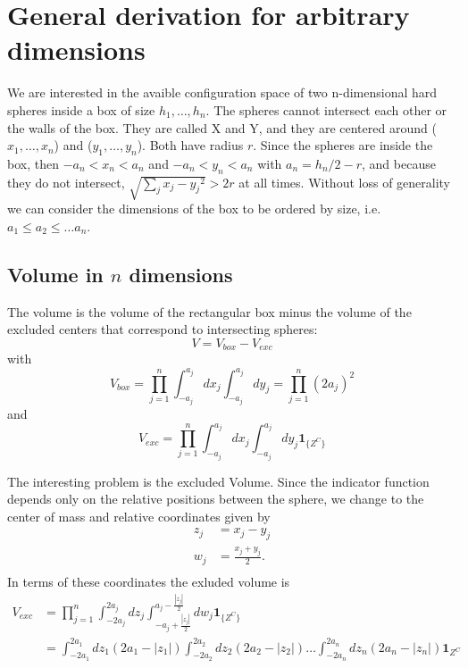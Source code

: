 \documentclass[superscriptaddress,pre,reprint,showpacs,twocolumn]{revtex4-1}
\newcommand{\indicatorsymbol}{\mathbf{1}}
\newcommand{\indicator}[1]{\indicatorsymbol_{ \{   #1 \} } }
\begin{document}
\onecolumngrid
\appendix

\section{General derivation for arbitrary dimensions}
\label{app:area_volumeNd}

We are interested in the avaible configuration space
of two n-dimensional hard spheres inside a box of size $h_1,\ldots,h_n$. The
spheres cannot intersect each other or the walls of the box. They are called
X and Y, and they are
centered around ($x_1,\ldots,x_n$) and ($y_1,\ldots,y_n$). Both have radius $r$.
Since the spheres are inside the box,
then $-a_n<x_n<a_n$ and $-a_n<y_n<a_n$ with $a_n = h_n/2 - r$, and
because they do not intersect, $\sqrt{\sum_j {x_j - y_j}^2}>2r$ at all times.
Without loss of generality we can consider the dimensions of the box to
be ordered by size, i.e. $a_1 \leq a_2 \leq \ldots a_n$.

\subsection{Volume in $n$ dimensions}\label{app:volumend}

The volume is the volume of the rectangular box minus the
volume of the excluded centers that correspond to intersecting spheres:
\begin{equation}
V = V_{box} - V_{exc}
\end{equation}
with
\begin{equation}
V_{box} =  \prod_{j=1}^n \int_{-a_j}^{a_j} dx_j \int_{-a_j}^{a_j}  dy_j = \prod_{j=1}^n (2 a_j)^2 
\end{equation}
and
\begin{equation}
V_{exc} =  \prod_{j=1}^n \int_{-a_j}^{a_j} dx_j \int_{-a_j}^{a_j}  dy_j  \indicator{Z^C}
\end{equation}

The interesting problem is the excluded Volume. 
Since the indicator function depends only on the relative positions between the sphere,
we change to the center of mass and relative coordinates given by
\begin{align*}
z_j & = x_j -y_j \\
w_j & = \frac{x_j +y_j}{2} .\\
  \end{align*}
In terms of these coordinates the exluded volume is 
\begin{align}
V_{exc} & =  \prod_{j=1}^n \int_{-2a_j}^{2a_j} dz_j \int_{-a_j + \frac{|z_j|}{2}}^{a_j - \frac{|z_j|}{2}}  dw_j  \indicator{Z^C} \\
& = \int_{-2a_1}^{2a_1} dz_1 (2a_1 -|z_1|) \int_{-2a_2}^{2a_2} dz_2 (2a_2 - |z_2|)  \ldots \int_{-2a_n}^{2a_n} dz_n (2a_n - |z_n|)  \mathbf{1}_{Z^C} 
\end{align}
 
\end{document}
